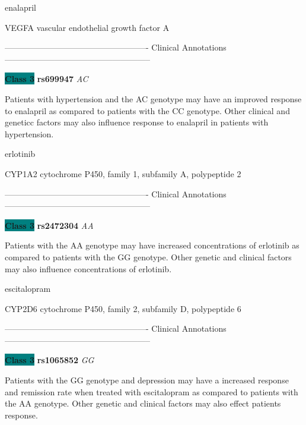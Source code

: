 \documentclass{resume} %
\begin{document}
\begin{rSection}{ enalapril }
\begin{rSubsection}{ VEGFA }{ vascular endothelial growth factor A }{}{}
\item[] ---------------------------------------------------- Clinical Annotations -----------------------------------------------------\newline
\item \textbf{\colorbox{teal} {Class 3}} \textbf{ rs699947 } \textit{ AC }
\item[] Patients with hypertension and the AC genotype may have an improved response to enalapril as compared to patients with the CC genotype. Other clinical and geneticc factors may also influence response to enalapril in patients with hypertension. 
\end{rSubsection}

\end{rSection}\begin{rSection}{ erlotinib }
\item[]

\begin{rSubsection}{ CYP1A2 }{ cytochrome P450, family 1, subfamily A, polypeptide 2 }{}{}
\item[]

\item[] ---------------------------------------------------- Clinical Annotations -----------------------------------------------------\newline
\item \textbf{\colorbox{teal} {Class 3}} \textbf{ rs2472304 } \textit{ AA }
\item[] Patients with the AA genotype may have increased concentrations of erlotinib as compared to patients with the GG genotype. Other genetic and clinical factors may also influence concentrations of erlotinib.
\end{rSubsection}

\end{rSection}\begin{rSection}{ escitalopram }
\item[]

\begin{rSubsection}{ CYP2D6 }{ cytochrome P450, family 2, subfamily D, polypeptide 6 }{}{}
\item[]

\item[] ---------------------------------------------------- Clinical Annotations -----------------------------------------------------\newline
\item \textbf{\colorbox{teal} {Class 3}} \textbf{ rs1065852 } \textit{ GG }
\item[] Patients with the GG genotype and depression may have a increased response and remission rate when treated with escitalopram as compared to patients with the AA genotype. Other genetic and clinical factors may also effect patients response.
\end{rSubsection}


\end{rSection}
\end{document}
